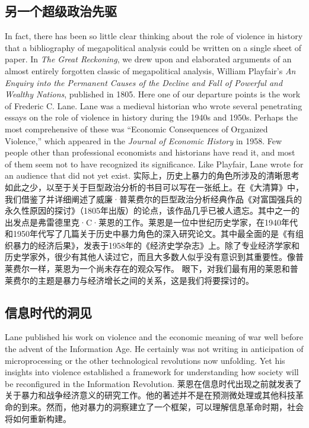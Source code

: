 \begin{Parallel}{97mm}{45mm}
\subsection{另一个超级政治先驱}


  \ParallelLText
  {In fact, there has been so little clear thinking about the role of violence in history that a bibliography of megapolitical analysis could be written on a single sheet of paper. In \emph{The Great Reckoning}, we drew upon and elaborated arguments of an almost entirely forgotten classic of megapolitical analysis, William Playfair's \emph{An Enquiry into the Permanent Causes of the Decline and Fall of Powerful and Wealthy Nations}, published in 1805. Here one of our departure points is the work of Frederic C. Lane. Lane was a medieval historian who wrote several penetrating essays on the role of violence in history during the 1940s and 1950s. Perhaps the most comprehensive of these was “Economic Consequences of Organized Violence,” which appeared in the \emph{Journal of Economic History} in 1958. Few people other than professional economists and historians have read it, and most of them seem not to have recognized its significance. Like Playfair, Lane wrote for an audience that did not yet exist.  }  
  \ParallelRText
  {\small 实际上，历史上暴力的角色所涉及的清晰思考如此之少，以至于关于巨型政治分析的书目可以写在一张纸上。在《大清算》中，我们借鉴了并详细阐述了威廉·普莱费尔的巨型政治分析经典作品《对富国强兵的永久性原因的探讨》（1805年出版）的论点，该作品几乎已被人遗忘。其中之一的出发点是弗雷德里克·C·莱恩的工作。莱恩是一位中世纪历史学家，在1940年代和1950年代写了几篇关于历史中暴力角色的深入研究论文。其中最全面的是《有组织暴力的经济后果》，发表于1958年的《经济史学杂志》上。除了专业经济学家和历史学家外，很少有其他人读过它，而且大多数人似乎没有意识到其重要性。像普莱费尔一样，莱恩为一个尚未存在的观众写作。 眼下，对我们最有用的莱恩和普莱费尔的主题是暴力与经济增长之间的关系，这是我们将要探讨的。 }
  \ParallelPar


\subsection{信息时代的洞见}

  \ParallelLText
  {Lane published his work on violence and the economic meaning of war well before the advent of the Information Age. He certainly was not writing in anticipation of microprocessing or the other technological revolutions now unfolding. Yet his insights into violence established a framework for understanding how society will be reconfigured in the Information Revolution.   }  
  \ParallelRText
  {\small 莱恩在信息时代出现之前就发表了关于暴力和战争经济意义的研究工作。他的著述并不是在预测微处理或其他科技革命的到来。然而，他对暴力的洞察建立了一个框架，可以理解信息革命时期，社会将如何重新构建。}
  \ParallelPar



\end{Parallel}
